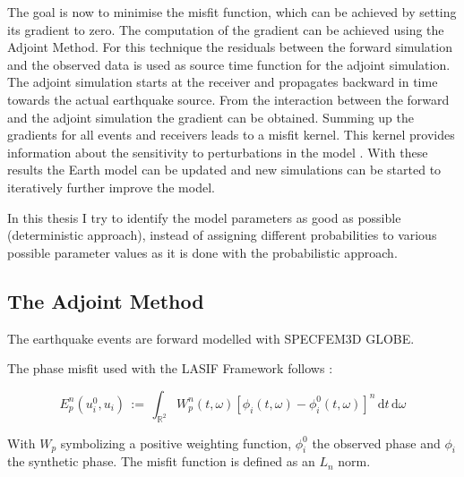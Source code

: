 
The goal is now to minimise the misfit function, which can be achieved by setting its gradient to zero.
The computation of the gradient can be achieved using the Adjoint Method. 
For this technique the residuals between the forward simulation and the observed data is used as source time function %
for the adjoint simulation. 
The adjoint simulation starts at the receiver and propagates backward in time towards the actual earthquake source.
From the interaction between the forward and the adjoint simulation the gradient can be obtained. 
Summing up the gradients for all events and receivers leads to a misfit kernel. 
This kernel provides information about the sensitivity to perturbations in the model \citep{Magnoni2012}.
With these results the Earth model can be updated and new simulations can be started to iteratively further improve the model.

In this thesis I try to identify the model parameters as good as possible (deterministic approach), instead of assigning
different probabilities to various possible parameter values as it is done with the probabilistic approach.

\subsection{The Adjoint Method}


The earthquake events are forward modelled with SPECFEM3D GLOBE. 



The phase misfit used with the LASIF Framework follows \citealp{Fichtner2008}:

\begin{equation} 
E_p^n(u_i^0, u_i) \, := \, \int_{\mathbb{R}^2} W_p^n(t,\omega) [\phi_i(t,\omega) - \phi_i^0(t,\omega)]^n 
   \, \mathrm{d}t \, \mathrm{d}\omega
\end{equation}

With $W_p$ symbolizing a positive weighting function, $\phi_i^0$ the observed phase and $\phi_i$ the synthetic phase.
The misfit function is defined as an $L_n$ norm.






